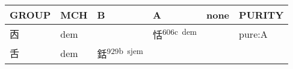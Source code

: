 \documentclass[14pt,a4paper]{scrartcl}
\begin{document}
\begin{longtable}[c]{@{}llllll@{}}
\toprule
\begin{minipage}[b]{0.14\columnwidth}\raggedright\strut
GROUP
\strut\end{minipage} &
\begin{minipage}[b]{0.14\columnwidth}\raggedright\strut
MCH
\strut\end{minipage} &
\begin{minipage}[b]{0.14\columnwidth}\raggedright\strut
B
\strut\end{minipage} &
\begin{minipage}[b]{0.14\columnwidth}\raggedright\strut
A
\strut\end{minipage} &
\begin{minipage}[b]{0.14\columnwidth}\raggedright\strut
none
\strut\end{minipage} &
\begin{minipage}[b]{0.14\columnwidth}\raggedright\strut
PURITY
\strut\end{minipage}\tabularnewline
\midrule
\endhead
\begin{minipage}[t]{0.14\columnwidth}\raggedright\strut
㐁
\strut\end{minipage} &
\begin{minipage}[t]{0.14\columnwidth}\raggedright\strut
dem
\strut\end{minipage} &
\begin{minipage}[t]{0.14\columnwidth}\raggedright\strut
\strut\end{minipage} &
\begin{minipage}[t]{0.14\columnwidth}\raggedright\strut
恬\textsuperscript{606c~dem}
\strut\end{minipage} &
\begin{minipage}[t]{0.14\columnwidth}\raggedright\strut
\strut\end{minipage} &
\begin{minipage}[t]{0.14\columnwidth}\raggedright\strut
pure:A
\strut\end{minipage}\tabularnewline
\begin{minipage}[t]{0.14\columnwidth}\raggedright\strut
舌
\strut\end{minipage} &
\begin{minipage}[t]{0.14\columnwidth}\raggedright\strut
dem
\strut\end{minipage} &
\begin{minipage}[t]{0.14\columnwidth}\raggedright\strut
銛\textsuperscript{929b~sjem}
\strut\end{minipage} &

\end{longtable}
\end{document}
